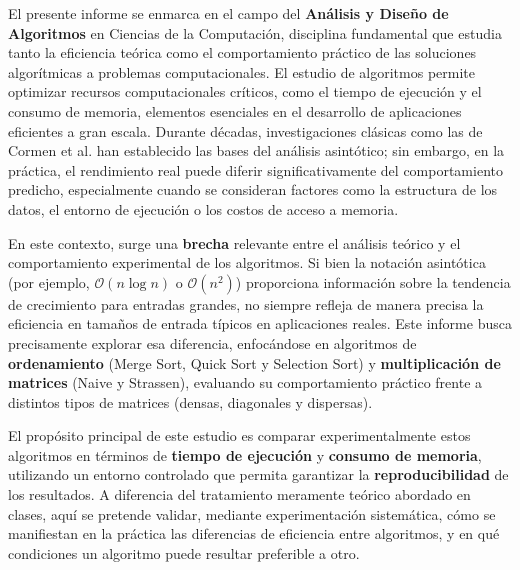 El presente informe se enmarca en el campo del \textbf{Análisis y Diseño de Algoritmos} en Ciencias de la Computación, disciplina fundamental que estudia tanto la eficiencia teórica como el comportamiento práctico de las soluciones algorítmicas a problemas computacionales. El estudio de algoritmos permite optimizar recursos computacionales críticos, como el tiempo de ejecución y el consumo de memoria, elementos esenciales en el desarrollo de aplicaciones eficientes a gran escala. Durante décadas, investigaciones clásicas como las de Cormen et al. han establecido las bases del análisis asintótico; sin embargo, en la práctica, el rendimiento real puede diferir significativamente del comportamiento predicho, especialmente cuando se consideran factores como la estructura de los datos, el entorno de ejecución o los costos de acceso a memoria.

En este contexto, surge una \textbf{brecha} relevante entre el análisis teórico y el comportamiento experimental de los algoritmos. Si bien la notación asintótica (por ejemplo, $\mathcal{O}(n\log n)$ o $\mathcal{O}(n^2)$) proporciona información sobre la tendencia de crecimiento para entradas grandes, no siempre refleja de manera precisa la eficiencia en tamaños de entrada típicos en aplicaciones reales. Este informe busca precisamente explorar esa diferencia, enfocándose en algoritmos de \textbf{ordenamiento} (Merge Sort, Quick Sort y Selection Sort) y \textbf{multiplicación de matrices} (Naive y Strassen), evaluando su comportamiento práctico frente a distintos tipos de matrices (densas, diagonales y dispersas).

El propósito principal de este estudio es comparar experimentalmente estos algoritmos en términos de \textbf{tiempo de ejecución} y \textbf{consumo de memoria}, utilizando un entorno controlado que permita garantizar la \textbf{reproducibilidad} de los resultados. A diferencia del tratamiento meramente teórico abordado en clases, aquí se pretende validar, mediante experimentación sistemática, cómo se manifiestan en la práctica las diferencias de eficiencia entre algoritmos, y en qué condiciones un algoritmo puede resultar preferible a otro.